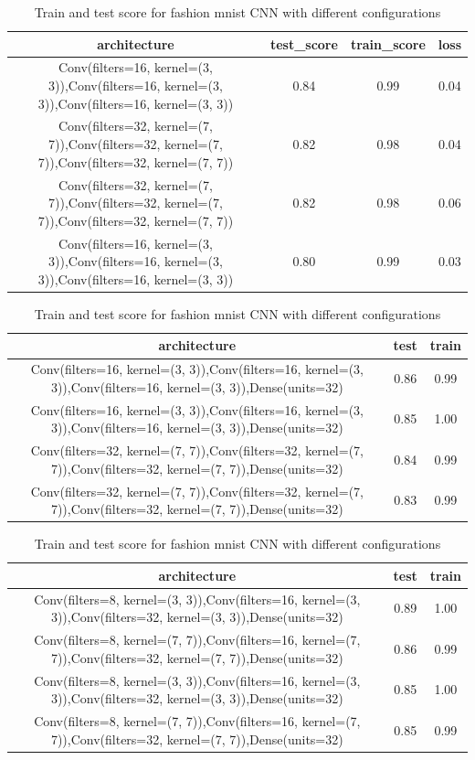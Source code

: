 \documentclass[10pt]{SelfArx} %
\begin{document}
\begin{table}[]
	\begin{tabular}{@{}cccc@{}}
		\toprule
		architecture & test\_score & train\_score & loss \\ \midrule
		Conv(filters=16, kernel=(3, 3)),Conv(filters=16, kernel=(3, 3)),Conv(filters=16, kernel=(3, 3)) & 0.84 & 0.99 & 0.04 \\
		Conv(filters=32, kernel=(7, 7)),Conv(filters=32, kernel=(7, 7)),Conv(filters=32, kernel=(7, 7)) & 0.82 & 0.98 & 0.04 \\
		Conv(filters=32, kernel=(7, 7)),Conv(filters=32, kernel=(7, 7)),Conv(filters=32, kernel=(7, 7)) & 0.82 & 0.98 & 0.06 \\
		Conv(filters=16, kernel=(3, 3)),Conv(filters=16, kernel=(3, 3)),Conv(filters=16, kernel=(3, 3)) & 0.80 & 0.99 & 0.03 \\ \bottomrule
	\end{tabular}
	\caption{Train and test score for fashion mnist CNN  with different configurations}
	\label{tfashion3}
\end{table}
\begin{table}[]
	\begin{tabular}{@{}ccc@{}}
		\toprule
		architecture & test & train \\ \midrule
		Conv(filters=16, kernel=(3, 3)),Conv(filters=16, kernel=(3, 3)),Conv(filters=16, kernel=(3, 3)),Dense(units=32) & 0.86 & 0.99  \\
		Conv(filters=16, kernel=(3, 3)),Conv(filters=16, kernel=(3, 3)),Conv(filters=16, kernel=(3, 3)),Dense(units=32) & 0.85 & 1.00  \\
		Conv(filters=32, kernel=(7, 7)),Conv(filters=32, kernel=(7, 7)),Conv(filters=32, kernel=(7, 7)),Dense(units=32) & 0.84 & 0.99 \\
		Conv(filters=32, kernel=(7, 7)),Conv(filters=32, kernel=(7, 7)),Conv(filters=32, kernel=(7, 7)),Dense(units=32) & 0.83 & 0.99 \\ \bottomrule
	\end{tabular}
	\caption{Train and test score for fashion mnist CNN  with different configurations}
	\label{tfashion4}
\end{table}
\begin{table}[]
	\begin{tabular}{@{}ccc@{}}
		\toprule
		architecture & test & train  \\ \midrule
		Conv(filters=8, kernel=(3, 3)),Conv(filters=16, kernel=(3, 3)),Conv(filters=32, kernel=(3, 3)),Dense(units=32) & 0.89 & 1.00 \\
		Conv(filters=8, kernel=(7, 7)),Conv(filters=16, kernel=(7, 7)),Conv(filters=32, kernel=(7, 7)),Dense(units=32) & 0.86 & 0.99 \\
		Conv(filters=8, kernel=(3, 3)),Conv(filters=16, kernel=(3, 3)),Conv(filters=32, kernel=(3, 3)),Dense(units=32) & 0.85 & 1.00  \\
		Conv(filters=8, kernel=(7, 7)),Conv(filters=16, kernel=(7, 7)),Conv(filters=32, kernel=(7, 7)),Dense(units=32) & 0.85 & 0.99  \\ \bottomrule
	\end{tabular}
	\caption{Train and test score for fashion mnist CNN  with different configurations}
	\label{tfashion5}
\end{table}
\end{document}
